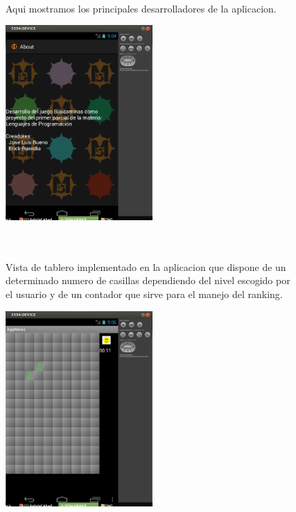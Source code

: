 \documentclass[../documentacion_buscaminas2013.tex]{subfiles}
\begin{document}
\begin{figure}[!ht]
\end{figure}

\begin{figure}[!ht]
\paragraph{ } Aqui mostramos los principales desarrolladores de la aplicacion.
\newline
	~\newline
	\begin{center}
		\includegraphics[width=0.5\textwidth]{./images/about.png}
	\end{center}

~\newline
\paragraph{ } Vista de tablero implementado en la aplicacion que dispone de un determinado numero de casillas dependiendo del nivel escogido por el usuario y de un contador que sirve para el manejo del ranking.
\newline
	~\newline
	\begin{center}
		\includegraphics[width=0.5\textwidth]{./images/tablero.png}
	\end{center}

\end{figure}
\end{document}
